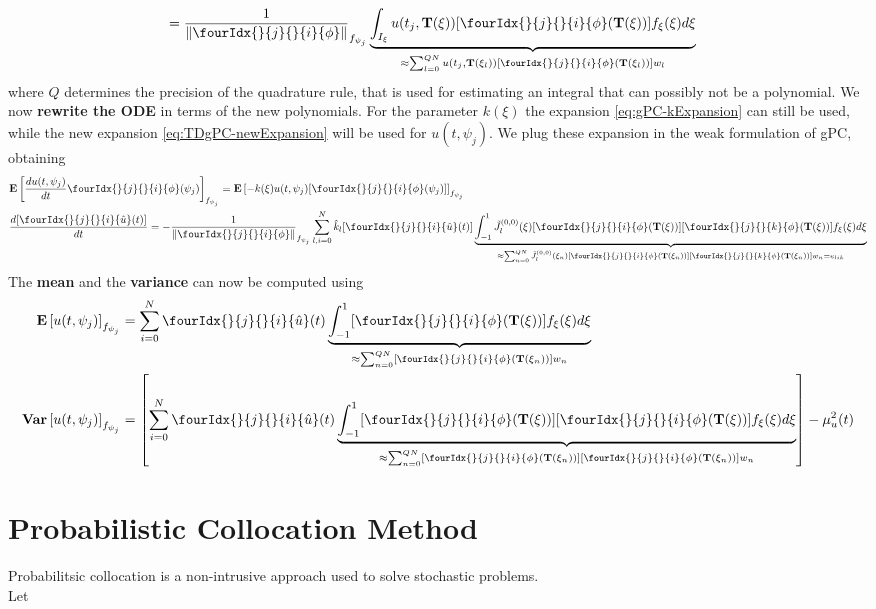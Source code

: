 \documentclass[a4paper,10pt]{article}
\begin{document}
\begin{exa}
\begin{align}
	&= \frac{1}{\Vert \fourIdx{}{j}{}{i}{\phi} \Vert}_{f_{\psi_j}} \underbrace{\int_{I_{\xi}} u(t_j,\mathbf{T}(\xi)) [\fourIdx{}{j}{}{i}{\phi}(\mathbf{T}(\xi))] f_{\xi}(\xi) d\xi}_{\approx \sum_{l=0}^{Q N} u(t_j,\mathbf{T}(\xi_l)) [\fourIdx{}{j}{}{i}{\phi}(\mathbf{T}(\xi_l))] w_l} \notag
\end{align}
where $ Q $ determines the precision of the quadrature rule, that is used for estimating an integral that can possibly not be a polynomial. We now \textbf{rewrite the ODE} in terms of the new polynomials. For the parameter $k(\xi)$ the expansion \eqref{eq:gPC-kExpansion} can still be used, while the new expansion \eqref{eq:TDgPC-newExpansion} will be used for $ u(t,\psi_j) $. We plug these expansion in the weak formulation of gPC, obtaining
\begin{align}
	&\Exp\left[ \frac{du(t,\psi_j)}{dt} \fourIdx{}{j}{}{i}{\phi}(\psi_j) \right]_{f_{\psi_j}} = \Exp\left[ -k(\xi)u(t,\psi_j)[\fourIdx{}{j}{}{i}{\phi}(\psi_j)] \right]_{f_{\psi_j}}\\
	&\frac{d[\fourIdx{}{j}{}{i}{\hat{u}}(t)]}{dt} = - \frac{1}{\Vert \fourIdx{}{j}{}{i}{\phi} \Vert}_{f_{\psi_j}} \sum_{l,i=0}^N \hat{k}_l [\fourIdx{}{j}{}{i}{\hat{u}}(t)] \underbrace{\int_{-1}^1 \tilde{J}_l^{(0,0)}(\xi) [\fourIdx{}{j}{}{i}{\phi}(\mathbf{T}(\xi))] [\fourIdx{}{j}{}{k}{\phi}(\mathbf{T}(\xi))] f_\xi(\xi) d\xi}_{\approx \sum_{n=0}^{Q N} \tilde{J}_l^{(0,0)}(\xi_n) [\fourIdx{}{j}{}{i}{\phi}(\mathbf{T}(\xi_n))] [\fourIdx{}{j}{}{k}{\phi}(\mathbf{T}(\xi_n))] w_n = e_{lik}}
\end{align}
The \textbf{mean} and the \textbf{variance} can now be computed using
\begin{align}
	\Exp \left[ u(t,\psi_j) \right]_{f_{\psi_j}} &= \sum_{i=0}^N \fourIdx{}{j}{}{i}{\hat{u}}(t) \underbrace{\int_{-1}^{1} [\fourIdx{}{j}{}{i}{\phi}(\mathbf{T}(\xi))] f_\xi(\xi) d\xi}_{\approx \sum_{n=0}^{QN} [\fourIdx{}{j}{}{i}{\phi}(\mathbf{T}(\xi_n))] w_n} \\
	\Var \left[ u(t,\psi_j) \right]_{f_{\psi_j}} &= \left[\sum_{i=0}^N \fourIdx{}{j}{}{i}{\hat{u}}(t) \underbrace{\int_{-1}^{1} [\fourIdx{}{j}{}{i}{\phi}(\mathbf{T}(\xi))] [\fourIdx{}{j}{}{i}{\phi}(\mathbf{T}(\xi))] f_\xi(\xi) d\xi}_{\approx \sum_{n=0}^{QN} [\fourIdx{}{j}{}{i}{\phi}(\mathbf{T}(\xi_n))] [\fourIdx{}{j}{}{i}{\phi}(\mathbf{T}(\xi_n))] w_n} \right] - \mu_u^2(t)
\end{align}
\end{exa}

\section{Probabilistic Collocation Method}
Probabilitsic collocation is a non-intrusive approach used to solve stochastic problems.\\
Let 
\end{document}
